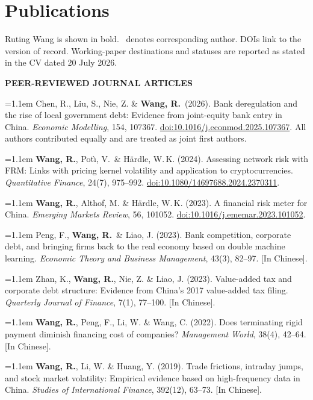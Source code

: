 \documentclass[11pt]{article}
\newcommand{\RW}{\textbf{Wang, R.}}
\newcommand{\corr}{\raisebox{0.55ex}{\sff\fontsize{6.5}{6.5}\selectfont*}}
\newcommand{\subhead}[1]{%
  \par\addvspace{8pt}\needspace{3\baselineskip}%
  {\sff\bfseries\fontsize{9}{11}\selectfont\color{plumdeep}%
    \addfontfeature{LetterSpace=3.0}\MakeUppercase{#1}}%
  \par\vspace{3pt}}
\newcommand{\pubitem}[1]{%
  \par\begingroup\sloppy\noindent\fontsize{9.2}{12.3}\selectfont%
  \hangindent=1.1em\hangafter=1 #1\par\endgroup\addvspace{3.4pt}}
\begin{document}
\section{Publications}
{\footnotesize\color{muted}Ruting Wang is shown in bold. \corr\ denotes corresponding author.
DOIs link to the version of record. Working-paper destinations and statuses are reported as
stated in the CV dated 20 July 2026.}
\par\vspace{5pt}

\subhead{Peer-reviewed journal articles}
\pubitem{Chen, R., Liu, S.\corr, Nie, Z. \& \RW\ (2026). Bank deregulation and the rise of
local government debt: Evidence from joint-equity bank entry in China.
\textit{Economic Modelling}, 154, 107367.
\href{https://doi.org/10.1016/j.econmod.2025.107367}{doi:10.1016/j.econmod.2025.107367}.
All authors contributed equally and are treated as joint first authors.}

\pubitem{\RW, Pot\`\i, V.\corr\ \& H\"ardle, W.\,K. (2024). Assessing network risk with FRM:
Links with pricing kernel volatility and application to cryptocurrencies.
\textit{Quantitative Finance}, 24(7), 975--992.
\href{https://doi.org/10.1080/14697688.2024.2370311}{doi:10.1080/14697688.2024.2370311}.}

\pubitem{\RW\corr, Althof, M. \& H\"ardle, W.\,K. (2023). A financial risk meter for China.
\textit{Emerging Markets Review}, 56, 101052.
\href{https://doi.org/10.1016/j.ememar.2023.101052}{doi:10.1016/j.ememar.2023.101052}.}

\pubitem{Peng, F., \RW\corr\ \& Liao, J. (2023). Bank competition, corporate debt, and
bringing firms back to the real economy based on double machine learning.
\textit{Economic Theory and Business Management}, 43(3), 82--97. [In Chinese].}

\pubitem{Zhan, K., \RW\corr, Nie, Z. \& Liao, J. (2023). Value-added tax and corporate debt
structure: Evidence from China's 2017 value-added tax filing.
\textit{Quarterly Journal of Finance}, 7(1), 77--100. [In Chinese].}

\pubitem{\RW, Peng, F., Li, W. \& Wang, C. (2022). Does terminating rigid payment diminish
financing cost of companies? \textit{Management World}, 38(4), 42--64. [In Chinese].}

\pubitem{\RW, Li, W. \& Huang, Y. (2019). Trade frictions, intraday jumps, and stock market
volatility: Empirical evidence based on high-frequency data in China.
\textit{Studies of International Finance}, 392(12), 63--73. [In Chinese].}
\end{document}
